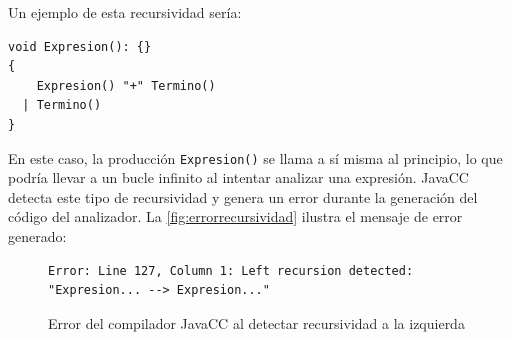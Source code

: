 
Un ejemplo de esta recursividad sería:

\begin{lstlisting}
void Expresion(): {}
{
    Expresion() "+" Termino()
  | Termino()
}
\end{lstlisting}

En este caso, la producción \lstinline{Expresion()} se llama a sí misma al principio, lo que podría llevar a un bucle infinito al intentar analizar una expresión. JavaCC detecta este tipo de recursividad y genera un error durante la generación del código del analizador. La \autoref{fig:errorrecursividad} ilustra el mensaje de error generado:

\begin{figure}[H]
\centering
\begin{lstlisting}
Error: Line 127, Column 1: Left recursion detected: "Expresion... --> Expresion..."
\end{lstlisting}
\caption{\label{fig:errorrecursividad}Error del compilador JavaCC al detectar recursividad a la izquierda}
\end{figure}




